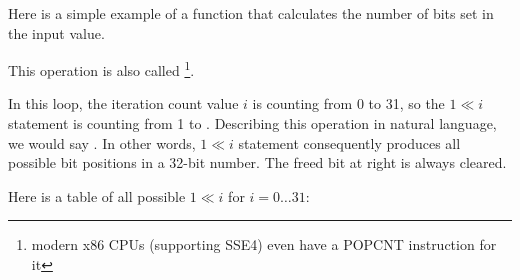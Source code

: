 ﻿

Here is a simple example of a function that calculates the number of bits set in the input value.

This operation is also called \footnote{modern x86 CPUs (supporting SSE4) even have a POPCNT instruction for it}.



In this loop, the iteration count value $i$ is counting from 0 to 31, 
so the $1 \ll i$ statement is counting from 1 to .
Describing this operation in natural language, we would say .
In other words, $1 \ll i$ statement consequently produces all possible bit positions in a 32-bit number.
The freed bit at right is always cleared.

Here is a table of all possible $1 \ll i$ 
for $i=0 \ldots 31$:

